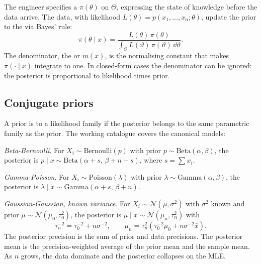 The engineer specifies a  $\pi(\theta)$ on
$\Theta$, expressing the state of knowledge before the data arrive.
The data, with likelihood $L(\theta) = p(x_{1}, \ldots, x_{n};
\theta)$, update the prior to the  via
Bayes' rule:
\[
\pi(\theta \mid x) = \frac{L(\theta)\, \pi(\theta)}
                          {\int_{\Theta} L(\vartheta)\, \pi(\vartheta)\,\dd\vartheta}.
\]
The denominator, the  or
 $m(x)$, is the normalising constant that makes
$\pi(\cdot \mid x)$ integrate to one. In closed-form cases the
denominator can be ignored: the posterior is proportional to
likelihood times prior.

\subsection{Conjugate priors}

A prior is  to a likelihood family if the
posterior belongs to the same parametric family as the prior. The
working catalogue covers the canonical models:

\textit{Beta-Bernoulli}. For $X_{i} \sim \mathrm{Bernoulli}(p)$ with
prior $p \sim \mathrm{Beta}(\alpha, \beta)$, the posterior is
$p \mid x \sim \mathrm{Beta}(\alpha + s,\, \beta + n - s)$, where
$s = \sum x_{i}$.

\textit{Gamma-Poisson}. For $X_{i} \sim \mathrm{Poisson}(\lambda)$
with prior $\lambda \sim \mathrm{Gamma}(\alpha, \beta)$, the
posterior is $\lambda \mid x \sim \mathrm{Gamma}(\alpha + s,\,
\beta + n)$.

\textit{Gaussian-Gaussian, known variance}. For $X_{i} \sim
\mathcal{N}(\mu, \sigma^{2})$ with $\sigma^{2}$ known and prior
$\mu \sim \mathcal{N}(\mu_{0}, \tau_{0}^{2})$, the posterior is
$\mu \mid x \sim \mathcal{N}(\mu_{n}, \tau_{n}^{2})$ with
\[
\tau_{n}^{-2} = \tau_{0}^{-2} + n\sigma^{-2},
\qquad
\mu_{n} = \tau_{n}^{2}\!\left(\tau_{0}^{-2}\mu_{0} + n\sigma^{-2}\bar{x}\right).
\]
The posterior precision is the sum of prior and data precisions.
The posterior mean is the precision-weighted average of the prior
mean and the sample mean. As $n$ grows, the data dominate and the
posterior collapses on the MLE.

